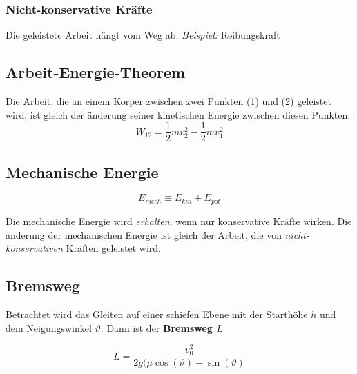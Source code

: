 \documentclass[7pt]{article}
\begin{document}
\begin{multicols*}{3}
\subsubsection{Nicht-konservative Kr{\"a}fte}
Die geleistete Arbeit h{\"a}ngt vom Weg ab. \newline
\emph{Beispiel:} Reibungskraft

\subsection{Arbeit-Energie-Theorem}

Die Arbeit, die an einem K{\"o}rper zwischen zwei Punkten (1) und (2) geleistet wird, ist gleich der {\"a}nderung seiner kinetischen Energie zwischen diesen Punkten.
\begin{equation*}
	W_{12} = \frac{1}{2}mv_2^2 - \frac{1}{2}mv_1^2
\end{equation*}

\subsection{Mechanische Energie}

\begin{equation*}
	E_{mech} \equiv E_{kin} + E_{pot}
\end{equation*}

Die mechanische Energie wird \emph{erhalten}, wenn nur konservative Kr{\"a}fte wirken. \newline
Die {\"a}nderung der mechanischen Energie ist gleich der Arbeit, die von \emph{nicht-konservativen} Kr{\"a}ften geleistet wird.

\subsection{Bremsweg}

Betrachtet wird das Gleiten auf einer schiefen Ebene mit der Starth{\"o}he $h$ und dem Neigungswinkel $\vartheta$. Dann ist der \textbf{Bremsweg $L$}

\begin{equation*}
	L = \frac{v_0^2}{2g(\mu\cos(\vartheta) - \sin(\vartheta)}
\end{equation*}

\end{multicols*}
\end{document}

